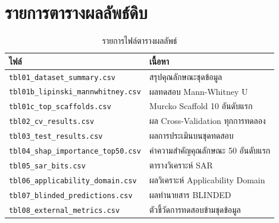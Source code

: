 \section{รายการตารางผลลัพธ์ดิบ}

\begin{table}[H]
\centering
\caption{รายการไฟล์ตารางผลลัพธ์}
\label{tab:tablist}
\begin{tabular}{L{6.4cm} L{7.4cm}}
\toprule
\textbf{ไฟล์} & \textbf{เนื้อหา}\\
\midrule
\texttt{tbl01\_dataset\_summary.csv} & สรุปคุณลักษณะชุดข้อมูล\\
\texttt{tbl01b\_lipinski\_mannwhitney.csv} & ผลทดสอบ Mann-Whitney U\\
\texttt{tbl01c\_top\_scaffolds.csv} & Murcko Scaffold 10 อันดับแรก\\
\texttt{tbl02\_cv\_results.csv} & ผล Cross-Validation ทุกการทดลอง\\
\texttt{tbl03\_test\_results.csv} & ผลการประเมินบนชุดทดสอบ\\
\texttt{tbl04\_shap\_importance\_top50.csv} & ค่าความสำคัญคุณลักษณะ 50 อันดับแรก\\
\texttt{tbl05\_sar\_bits.csv} & ตารางวิเคราะห์ SAR\\
\texttt{tbl06\_applicability\_domain.csv} & ผลวิเคราะห์ Applicability Domain\\
\texttt{tbl07\_blinded\_predictions.csv} & ผลทำนายสาร BLINDED\\
\texttt{tbl08\_external\_metrics.csv} & ตัวชี้วัดการทดสอบข้ามชุดข้อมูล\\
\bottomrule
\end{tabular}
\end{table}
